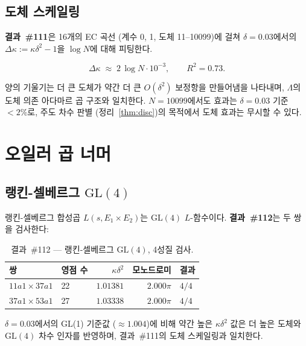 \documentclass[11pt, a4paper]{article}
\theoremstyle{plain}
\theoremstyle{definition}
\begin{document}
\subsection{도체 스케일링}
\label{ssec:conductor}

\textbf{결과~\#111}은 16개의 EC 곡선
(계수 0, 1, 도체 11--10099)에 걸쳐
$\delta=0.03$에서의 $\Delta\kappa := \kappa\delta^{2}-1$을
$\log N$에 대해 피팅한다.

\[
  \Delta\kappa \;\approx\; 2\,\log N \cdot 10^{-3}, \qquad R^{2}=0.73.
\]

양의 기울기는 더 큰 도체가 약간 더 큰 $O(\delta^{2})$ 보정항을 만들어냄을
나타내며, $\Lambda$의 도체 의존 아다마르 곱 구조와 일치한다.
$N=10099$에서도 효과는 $\delta=0.03$ 기준 $<2\%$로,
주도 차수 판별 (정리~\ref{thm:disc})의 목적에서
도체 효과는 무시할 수 있다.


\section{오일러 곱 너머}
\label{sec:beyond}

\subsection{랭킨-셀베르그 $\mathrm{GL}(4)$}
\label{sec:gl4rs}

랭킨-셀베르그 합성곱 $L(s, E_{1}\times E_{2})$는
$\mathrm{GL}(4)$ $L$-함수이다.
\textbf{결과~\#112}는 두 쌍을 검사한다:

\begin{table}[ht]
\centering
\caption{결과~\#112 — 랭킨-셀베르그 $\mathrm{GL}(4)$, 4성질 검사.}
\label{tab:rs112}
\small
\begin{tabular}{llrrl}
\toprule
쌍 & 영점 수 & $\kappa\delta^{2}$ & 모노드로미 & 결과 \\
\midrule
$11a1 \times 37a1$ & 22 & $1.01381$ & $2.000\pi$ & $4/4$ \\
$37a1 \times 53a1$ & 27 & $1.03338$ & $2.000\pi$ & $4/4$ \\
\bottomrule
\end{tabular}
\end{table}

$\delta=0.03$에서의 GL(1) 기준값 ($\approx 1.004$)에 비해
약간 높은 $\kappa\delta^{2}$ 값은
더 높은 도체와 $\mathrm{GL}(4)$ 차수 인자를 반영하며,
결과~\#111의 도체 스케일링과 일치한다.
\end{document}
